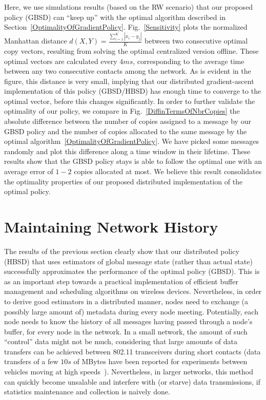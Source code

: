 Here, we use simulations results (based on the RW scenario) that our proposed policy (GBSD) can ``keep up'' with the optimal algorithm described in Section~\ref{OptimalityOfGradientPolicy}. Fig.~\ref{Sensitivity} plots the normalized Manhattan distance $d(X,Y) = \frac{\sum_{i=1}^{K}|x_i - y_j|}{K}$ between two consecutive optimal copy vectors, resulting from solving the optimal centralized version offline. These optimal vectors are calculated every $4ms$, corresponding to the average time between any two consecutive contacts among the network. As is evident in the figure, this distance is very small, implying that our distributed gradient-ascent implementation of this policy (GBSD/HBSD) has enough time to converge to the optimal vector, before this changes significantly. In order to further validate the optimality of our policy, we compare in Fig.~\ref{DiffinTermsOfNbrCopies} the absolute difference between the number of copies assigned to a message by our GBSD policy and the number of copies allocated to the same message by the optimal algorithm~\ref{OptimalityOfGradientPolicy}. We have picked some messages randomly and plot this difference along a time window in their lifetime. These results show that the GBSD policy stays is able to follow the optimal one with an average error of $1-2$ copies allocated at most. We believe this result consolidates the optimality properties of our proposed distributed implementation of the optimal policy.

\section{Maintaining Network History}
\label{sec:NetworkHistory}

The results of the previous section clearly show that our distributed policy (HBSD) that uses estimators of global message state (rather than actual state) successfully approximates the performance of the optimal policy (GBSD). This is as an important step towards a practical implementation of efficient buffer management and scheduling algorithms on wireless devices. Nevertheless, in order to derive good estimators in a distributed manner, nodes need to exchange (a possibly large amount of) metadata during every node meeting. Potentially, each node needs to know the history of all messages having passed through a node's buffer, for every node in the network. In a small network, the amount of such ``control'' data might not be much, considering that large amounts of data transfers can be achieved between 802.11 transceivers during short contacts (data transfers of a few $10s$ of MBytes have been reported for experiments between vehicles moving at high speeds~\cite{Keshav:Mobisys07}). Nevertheless, in larger networks, this method can quickly become unsalable and interfere with (or starve) data transmissions, if statistics maintenance and collection is naively done.

